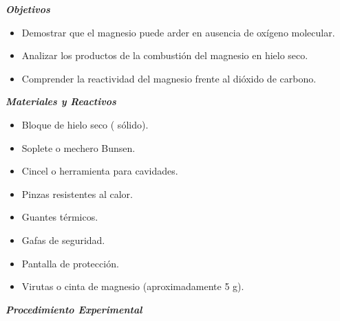     \textit{\textbf{Objetivos }} 
    \begin{itemize}
        \item Demostrar que el magnesio puede arder en ausencia de oxígeno molecular. 
    
        \item Analizar los productos de la combustión del magnesio en hielo seco.  
        
        \item Comprender la reactividad del magnesio frente al dióxido de carbono.
        
    \end{itemize}
    \textit{\textbf{Materiales y Reactivos }} 
    \begin{itemize}
        \item Bloque de hielo seco ( sólido). 
    
        \item Soplete o mechero Bunsen.
        
        \item Cincel o herramienta para cavidades. 
        
        \item Pinzas resistentes al calor.
        
        \item Guantes térmicos.
        
        \item Gafas de seguridad.

        \item Pantalla de protección.

        \item Virutas o cinta de magnesio (aproximadamente 5 g).
    \end{itemize}
    \textit{\textbf{Procedimiento Experimental}}  
